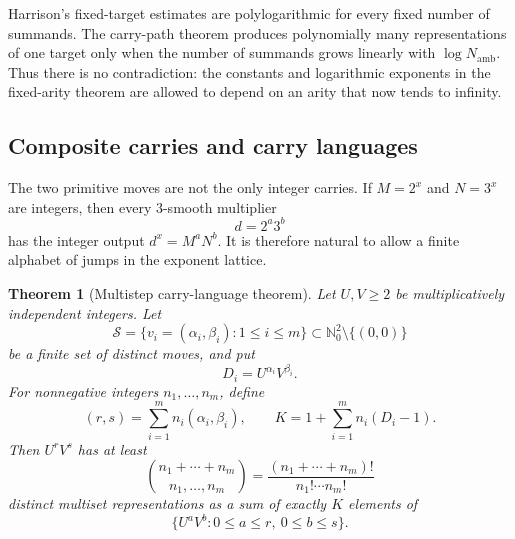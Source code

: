 \documentclass[11pt,oneside]{article}
\newtheorem{theorem}{Theorem}[section]
\theoremstyle{definition}
\newcommand{\N}{\mathbb{N}}
\begin{document}
\begin{roadblockbox}
Harrison's fixed-target estimates are polylogarithmic for every fixed number of summands.  The carry-path theorem produces polynomially many representations of one target only when the number of summands grows linearly with $\log N_{\mathrm{amb}}$.  Thus there is no contradiction: the constants and logarithmic exponents in the fixed-arity theorem are allowed to depend on an arity that now tends to infinity.
\end{roadblockbox}


\subsection{Composite carries and carry languages}

The two primitive moves are not the only integer carries.  If $M=2^x$ and $N=3^x$ are integers, then every $3$-smooth multiplier
\[
       d=2^a3^b
\]
has the integer output $d^x=M^aN^b$.  It is therefore natural to allow a finite alphabet of jumps in the exponent lattice.

\begin{theorem}[Multistep carry-language theorem]\label{thm:carrylanguage}
Let $U,V\ge2$ be multiplicatively independent integers.  Let
\[
  \mathcal S=\{v_i=(\alpha_i,\beta_i):1\le i\le m\}
       \subset\N_0^2\setminus\{(0,0)\}
\]
be a finite set of distinct moves, and put
\[
       D_i=U^{\alpha_i}V^{\beta_i}.
\]
For nonnegative integers $n_1,\ldots,n_m$, define
\[
  (r,s)=\sum_{i=1}^m n_i(\alpha_i,\beta_i),
  \qquad
  K=1+\sum_{i=1}^m n_i(D_i-1).
\]
Then $U^rV^s$ has at least
\begin{equation}\label{eq:multinomial-carries}
       \binom{n_1+\cdots+n_m}{n_1,\ldots,n_m}
       =\frac{(n_1+\cdots+n_m)!}{n_1!\cdots n_m!}
\end{equation}
distinct multiset representations as a sum of exactly $K$ elements of
\[
       \{U^aV^b:0\le a\le r,\ 0\le b\le s\}.
\]
\end{theorem}
\end{document}
